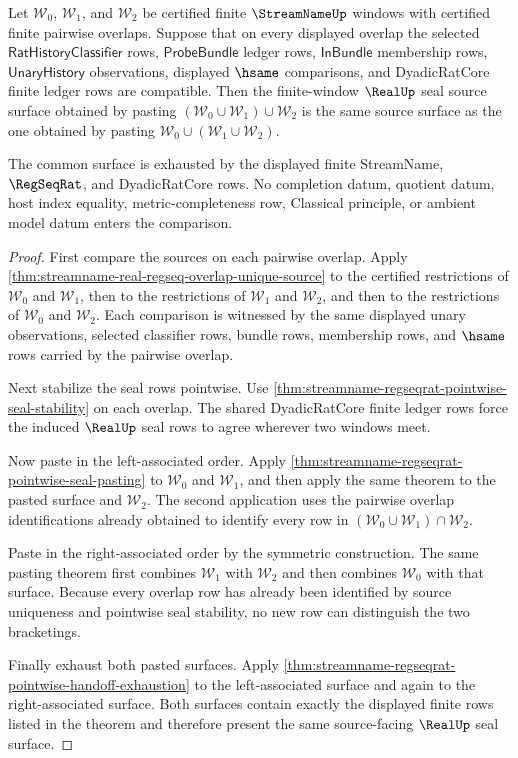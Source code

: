 \begin{theorem}
\label{thm:streamname-regseqrat-three-window-seal-coherence}
Let $\mathcal{W}_0$, $\mathcal{W}_1$, and $\mathcal{W}_2$ be certified finite
$\StreamNameUp$ windows with certified finite pairwise overlaps. Suppose that
on every displayed overlap the selected $\mathsf{RatHistoryClassifier}$ rows,
$\mathsf{ProbeBundle}$ ledger rows, $\mathsf{InBundle}$ membership rows,
$\mathsf{UnaryHistory}$ observations, displayed $\hsame$ comparisons, and
DyadicRatCore finite ledger rows are compatible. Then the finite-window
$\RealUp$ seal source surface obtained by pasting
$(\mathcal{W}_0 \cup \mathcal{W}_1) \cup \mathcal{W}_2$ is the same source
surface as the one obtained by pasting
$\mathcal{W}_0 \cup (\mathcal{W}_1 \cup \mathcal{W}_2)$.

The common surface is exhausted by the displayed finite StreamName,
$\RegSeqRat$, and DyadicRatCore rows. No completion datum, quotient datum, host
index equality, metric-completeness row, Classical principle, or ambient
model datum enters the comparison.
\end{theorem}
\begin{proof}
First compare the sources on each pairwise overlap. Apply
\autoref{thm:streamname-real-regseq-overlap-unique-source} to the certified
restrictions of $\mathcal{W}_0$ and $\mathcal{W}_1$, then to the restrictions
of $\mathcal{W}_1$ and $\mathcal{W}_2$, and then to the restrictions of
$\mathcal{W}_0$ and $\mathcal{W}_2$. Each comparison is witnessed by the same
displayed unary observations, selected classifier rows, bundle rows,
membership rows, and $\hsame$ rows carried by the pairwise overlap.

Next stabilize the seal rows pointwise. Use
\autoref{thm:streamname-regseqrat-pointwise-seal-stability} on each overlap.
The shared DyadicRatCore finite ledger rows force the induced $\RealUp$ seal
rows to agree wherever two windows meet.

Now paste in the left-associated order. Apply
\autoref{thm:streamname-regseqrat-pointwise-seal-pasting} to
$\mathcal{W}_0$ and $\mathcal{W}_1$, and then apply the same theorem to the
pasted surface and $\mathcal{W}_2$. The second application uses the pairwise
overlap identifications already obtained to identify every row in
$(\mathcal{W}_0 \cup \mathcal{W}_1) \cap \mathcal{W}_2$.

Paste in the right-associated order by the symmetric construction. The same
pasting theorem first combines $\mathcal{W}_1$ with $\mathcal{W}_2$ and then
combines $\mathcal{W}_0$ with that surface. Because every overlap row has
already been identified by source uniqueness and pointwise seal stability, no
new row can distinguish the two bracketings.

Finally exhaust both pasted surfaces. Apply
\autoref{thm:streamname-regseqrat-pointwise-handoff-exhaustion} to the
left-associated surface and again to the right-associated surface. Both
surfaces contain exactly the displayed finite rows listed in the theorem and
therefore present the same source-facing $\RealUp$ seal surface.
\end{proof}

